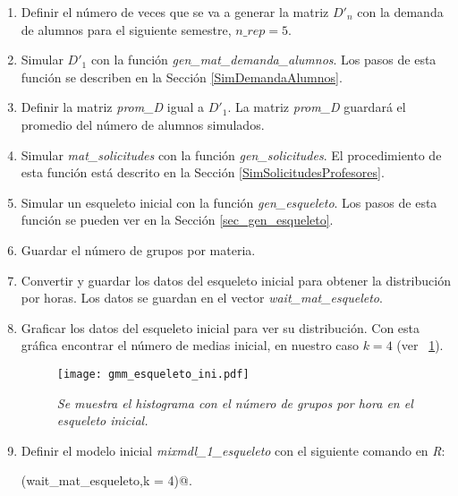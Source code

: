 \begin{enumerate}
\item Definir el número de veces que se va a generar la matriz $D'_{n}$ con la demanda de alumnos para el siguiente semestre, $n\_rep = 5$.

\item Simular $D'_{1}$ con la función \textit{gen\_mat\_demanda\_alumnos}. Los pasos de esta función se describen en la Sección \ref{SimDemandaAlumnos}.

\item Definir la matriz \textit{prom\_D} igual a $D'_{1}$. La matriz \textit{prom\_D} guardará el promedio del número de alumnos simulados.

\item Simular \textit{mat\_solicitudes} con la función \textit{gen\_solicitudes}. El procedimiento de esta función está descrito en la Sección \ref{SimSolicitudesProfesores}.

\item Simular un esqueleto inicial con la función \textit{gen\_esqueleto}. Los pasos de esta función se pueden ver en la Sección \ref{sec_gen_esqueleto}.

\item Guardar el número de grupos por materia.

\item Convertir y guardar los datos del esqueleto inicial para obtener la distribución por horas. Los datos se guardan en el vector \textit{wait\_mat\_esqueleto}.

\item Graficar los datos del esqueleto inicial para ver su distribución. Con esta gráfica encontrar el número de medias inicial, en nuestro caso $k = 4$ (ver \figurename{~\ref{hist_wait_esq_ini}}).

\begin{figure}[H]
\centering
\texttt{[image: gmm\_esqueleto\_ini.pdf]} %
\caption[\textit{Histograma con los datos del esqueleto inicial}]{\textit{Se muestra el histograma con el número de grupos por hora en el esqueleto inicial.}}\label{hist_wait_esq_ini}
\end{figure}

\item Definir el modelo inicial \textit{mixmdl\_1\_esqueleto} con el siguiente comando en \textit{R}:

\verb@normalmixEM(wait_mat_esqueleto,k = 4)@.
\end{enumerate}

